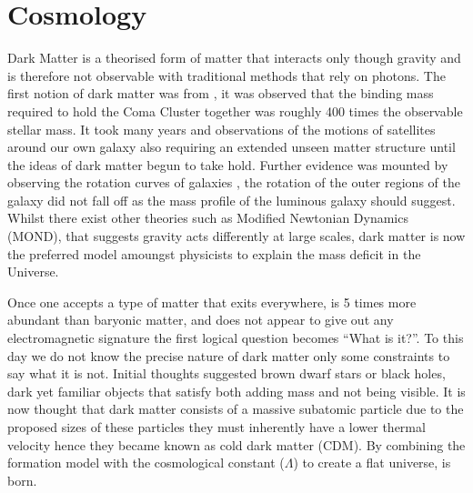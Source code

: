 \section{\LCDM Cosmology}
\label{sec:introLCDM}
Dark Matter is a theorised form of matter that interacts only though gravity and is therefore not observable with traditional methods that rely on photons. The first notion of dark matter was from \citet{Zwicky1933DieNebeln}, it was observed that the binding mass required to hold the Coma Cluster together was roughly 400 times the observable stellar mass. It took many years and observations of the motions of satellites around our own galaxy also requiring an extended unseen matter structure until the ideas of dark matter begun to take hold. Further evidence was mounted by observing the rotation curves of galaxies \citep{Roberts1973ComparisonTypes}, the rotation of the outer regions of the galaxy did not fall off as the mass profile of the luminous galaxy should suggest. Whilst there exist other theories such as Modified Newtonian Dynamics (MOND), that suggests gravity acts differently at large scales, dark matter is now the preferred model amoungst physicists to explain the mass deficit in the Universe. 

Once one accepts a type of matter that exits everywhere, is 5 times more abundant than baryonic matter, and does not appear to give out any electromagnetic signature the first logical question becomes ``What is it?''. To this day we do not know the precise nature of dark matter only some constraints to say what it is not. Initial thoughts suggested brown dwarf stars or black holes, dark yet familiar objects that satisfy both adding mass and not being visible. It is now thought that dark matter consists of a massive subatomic particle due to the proposed sizes of these particles they must inherently have a lower thermal velocity hence they became known as cold dark matter (CDM). By combining the formation model with the cosmological constant ($\Lambda$) to create a flat universe, \LCDM is born. 

